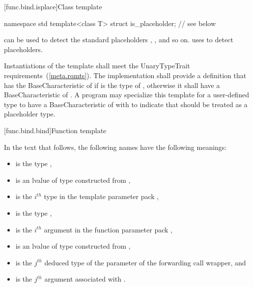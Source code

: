 [func.bind.isplace]{Class template }

%
\begin{codeblock}
namespace std {
  template<class T> struct is_placeholder; // see below
}
\end{codeblock}

\pnum
{} can be used to detect the standard placeholders
, , and so on.  uses
 to detect placeholders.

\pnum
Instantiations of the  template shall meet
the UnaryTypeTrait requirements~(\ref{meta.rqmts}). The implementation
shall provide a definition that has the BaseCharacteristic of
 if  is the type of
, otherwise it shall have a
BaseCharacteristic of . A program
may specialize this template for a user-defined type  to
have a BaseCharacteristic of 
with  to indicate that  should be
treated as a placeholder type.

[func.bind.bind]{Function template }

\pnum
In the text that follows, the following names have the following meanings:

\begin{itemize}
\item {} is the type ,
\item {} is an lvalue of type  constructed from ,
\item {} is the $i^{th}$ type in the template parameter pack ,
\item {} is the type ,
\item {} is the $i^{th}$ argument in the function parameter pack ,
\item {} is an lvalue of type  constructed from ,
\item {} is the $j^{th}$ deduced type of the  parameter
  of the forwarding call wrapper, and
\item {} is the $j^{th}$ argument associated with .
\end{itemize}

